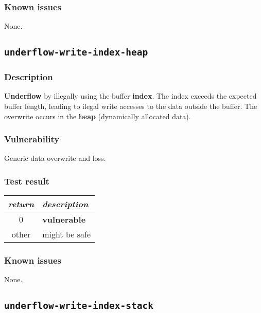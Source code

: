 \documentclass[a4paper]{book}
\begin{document}
\subsubsection{Known issues}

None.

\newpage

\subsection{\texttt{underflow-write-index-heap}}\label{test-underflow-write-index-heap}

\subsubsection{Description}

\textbf{Underflow} by illegally using the buffer \textbf{index}.
The index exceeds the expected buffer length,
leading to ilegal write accesses to the data outside the buffer.
The overwrite occurs in the \textbf{heap} (dynamically allocated data).

\subsubsection{Vulnerability}
Generic data overwrite and loss.

\subsubsection{Test result}
\begin{tabular}{cl}
  \toprule
  \emph{return}  & \emph{description} \\
  \midrule
  0              & \textbf{vulnerable} \\
  other          & might be safe \\
  \bottomrule
\end{tabular}

\subsubsection{Known issues}

None.

\newpage

\subsection{\texttt{underflow-write-index-stack}}\label{test-underflow-write-index-stack}
\end{document}
